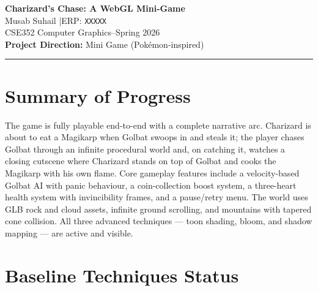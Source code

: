 \documentclass[11pt,a4paper]{article}
\begin{document}
\begin{center}
    {\LARGE\bfseries Charizard's Chase: A WebGL Mini-Game}\\[4pt]
    {\large Musab Suhail \quad|\quad ERP: \texttt{XXXXX}}\\[2pt]
    {\normalsize CSE352 Computer Graphics\quad--\quad Spring 2026}\\[2pt]
    {\normalsize \textbf{Project Direction:} Mini Game (Pokémon-inspired)}
\end{center}

\vspace{-4pt}\noindent\rule{\linewidth}{0.6pt}\vspace{6pt}

\section{Summary of Progress}

The game is fully playable end-to-end with a complete narrative arc. Charizard
is about to eat a Magikarp when Golbat swoops in and steals it; the player
chases Golbat through an infinite procedural world and, on catching it, watches
a closing cutscene where Charizard stands on top of Golbat and cooks the
Magikarp with his own flame. Core gameplay features include a velocity-based
Golbat AI with panic behaviour, a coin-collection boost system, a three-heart
health system with invincibility frames, and a pause/retry menu. The world uses
GLB rock and cloud assets, infinite ground scrolling, and mountains with tapered
cone collision. All three advanced techniques --- toon shading, bloom, and
shadow mapping --- are active and visible.

\section{Baseline Techniques Status}
\end{document}
